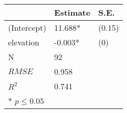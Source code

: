 \begin{center}
 \begin{tabular}{*{3}{l}}
 \hline
               & Estimate & S.E. \\
\hline 
 \hline
  (Intercept)   &    11.688*   &   (0.15) \\
  elevation   &    -0.003*   &   (0) \\
 \hline 
N   &    92    & \\
 $RMSE$       & 0.958    &  \\
 $R^2$       & 0.741    &  \\
 \hline\hline
* $p \le 0.05$\end{tabular}
\end{center}